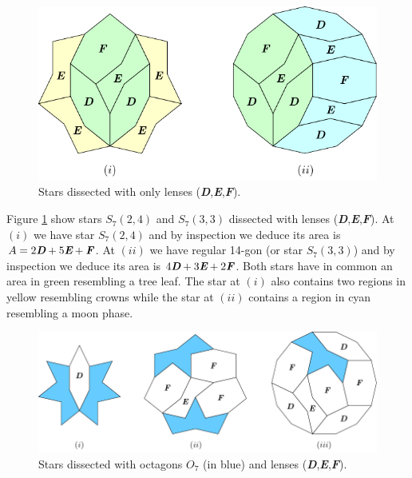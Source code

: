 \documentclass[11pt]{article}
\def\mathbi#1{\textbf{\em #1}}
\begin{document}
\begin{figure}[H]
\centering
\includegraphics[scale=1.1]{def/def-stars-2}
\caption{Stars dissected with only lenses (\mathbi{D},\mathbi{E},\mathbi{F}).}
\label{fig:def-stars-2}
\end{figure}

Figure \ref{fig:def-stars-2} show stars $S_7(2,4)$ and $S_7(3,3)$ dissected with lenses (\mathbi{D},\mathbi{E},\mathbi{F}).
At $(i)$ we have star $S_7(2,4)$ and by inspection we deduce its area is $A = 2\mathbi{D} + 5\mathbi{E} + \mathbi{F}$. At $(ii)$ we have regular 14-gon (or star $S_7(3,3)$) and by inspection we deduce its area is $4\mathbi{D} + 3\mathbi{E} + 2\mathbi{F}$. Both stars have in common an area in green resembling a tree leaf. The star at $(i)$ also contains two regions in yellow resembling crowns while the star at $(ii)$ contains a region in cyan resembling a moon phase.

\begin{figure}[H]
\centering
\includegraphics[scale=1.1]{def/def-stars-3}
\caption{Stars dissected with octagons \mathbi{$O_7$} (in blue) and lenses (\mathbi{D},\mathbi{E},\mathbi{F}).}
\label{fig:def-stars-3}
\end{figure}
 
\end{document}
